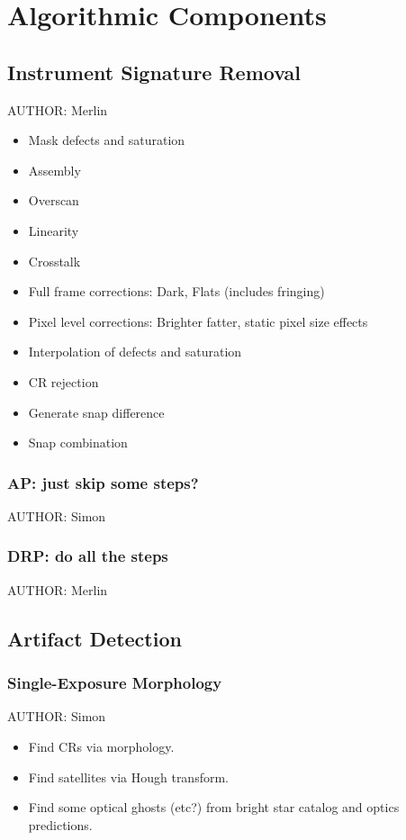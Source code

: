 \section{Algorithmic Components}
\label{sec:algorithmic-components}

\subsection{Instrument Signature Removal}
AUTHOR: Merlin
\begin{itemize}
\item Mask defects and saturation
\item Assembly
\item Overscan
\item Linearity
\item Crosstalk
\item Full frame corrections: Dark, Flats (includes fringing)
\item Pixel level corrections: Brighter fatter, static pixel size effects
\item Interpolation of defects and saturation
\item CR rejection
\item Generate snap difference
\item Snap combination
\end{itemize}

\subsubsection{AP: just skip some steps?}
AUTHOR: Simon

\subsubsection{DRP: do all the steps}
AUTHOR: Merlin


\subsection{Artifact Detection}

\subsubsection{Single-Exposure Morphology}
AUTHOR: Simon
\begin{itemize}
\item Find CRs via morphology.
\item Find satellites via Hough transform.
\item Find some optical ghosts (etc?) from bright star catalog and optics predictions.
\end{itemize}

